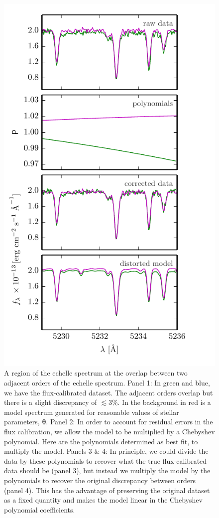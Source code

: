 \documentclass[iop,floatfix]{emulateapj}
\newcommand{\vt}{ {\bm \theta}}
\begin{document}
\begin{figure}[!htb]
\begin{center}
  \includegraphics{figs/chebyshev.pdf}
  \caption{A region of the echelle spectrum at the overlap between two adjacent orders of the echelle spectrum. Panel 1: In green and blue, we have the flux-calibrated dataset. The adjacent orders overlap but there is a slight discrepancy of $\lesssim 3$\%. In the background in red is a model spectrum generated for reasonable values of stellar parameters, $\vt$. Panel 2: In order to account for residual errors in the flux calibration, we allow the model to be multiplied by a Chebyshev polynomial. Here are the polynomials determined as best fit, to multiply the model. Panels 3 \& 4: In principle, we could divide the data by these polynomials to recover what the true flux-calibrated data should be (panel 3), but instead we multiply the model by the polynomials to recover the original discrepancy between orders (panel 4). This has the advantage of preserving the original dataset as a fixed quantity and makes the model linear in the Chebyshev polynomial coefficients.}
\label{fig:chebyshev}
\end{center}
\end{figure}
\end{document}
